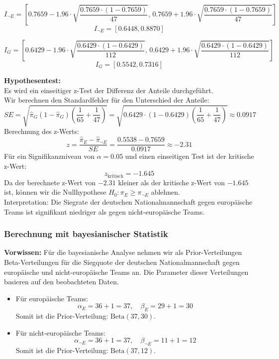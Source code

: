 \documentclass[a4paper,12pt]{article}
\begin{document}
\[
I_{\neg E} = \left[ 0.7659 - 1.96 \cdot \sqrt{\frac{0.7659 \cdot (1-0.7659)}{47}}, \, 0.7659 + 1.96 \cdot \sqrt{\frac{0.7659 \cdot (1-0.7659)}{47}} \right]
\]
\[
I_{\neg E} = [0.6448, 0.8870]
\]

\[
I_G = \left[ 0.6429 - 1.96 \cdot \sqrt{\frac{0.6429 \cdot (1-0.6429)}{112}}, \, 0.6429 + 1.96 \cdot \sqrt{\frac{0.6429 \cdot (1-0.6429)}{112}} \right]
\]
\[
I_G = [0.5542, 0.7316]
\]

\textbf{Hypothesentest:} \\
Es wird ein einseitiger z-Test der Differenz der Anteile durchgeführt. \\

Wir berechnen den Standardfehler für den Unterschied der Anteile:
\[
SE = \sqrt{\hat{\pi}_G(1 - \hat{\pi}_G) \left(\frac{1}{65} + \frac{1}{47}\right)} = \sqrt{0.6429 \cdot (1 - 0.6429) \left(\frac{1}{65} + \frac{1}{47}\right)} \approx 0.0917
\]
Berechnung des z-Werts:
\[
z = \frac{\hat{\pi}_E - \hat{\pi}_{\neg E}}{SE} = \frac{0.5538 - 0.7659}{0.0917} \approx -2.31
\]
Für ein Signifikanzniveau von \( \alpha = 0.05 \) und einen einseitigen Test ist der kritische z-Wert:
\[
z_{\text{kritisch}} = -1.645
\]
Da der berechnete z-Wert von \(-2.31\) kleiner als der kritische z-Wert von \(-1.645\) ist, können wir die Nullhypothese \( H_0 : \pi_E \geq \pi_{\neg E} \) ablehnen.\\
Interpretation: Die Siegrate der deutschen Nationalmannschaft gegen europäische Teams ist signifikant niedriger als gegen nicht-europäische Teams.

\subsubsection{Berechnung mit bayesianischer Statistik}

\textbf{Vorwissen:}
Für die bayesianische Analyse nehmen wir als Prior-Verteilungen Beta-Verteilungen für die Siegquote der deutschen Nationalmannschaft gegen europäische und nicht-europäische Teams an. Die Parameter dieser Verteilungen basieren auf den beobachteten Daten.

\begin{itemize}
  \item Für europäische Teams:
    \[
    \alpha_E = 36 + 1 = 37, \quad \beta_E = 29 + 1 = 30
    \]
    Somit ist die Prior-Verteilung: \( \text{Beta}(37, 30) \).

  \item Für nicht-europäische Teams:
    \[
    \alpha_{\neg E} = 36 + 1 = 37, \quad \beta_{\neg E} = 11 + 1 = 12
    \]
    Somit ist die Prior-Verteilung: \( \text{Beta}(37, 12) \).
\end{itemize}
\end{document}
